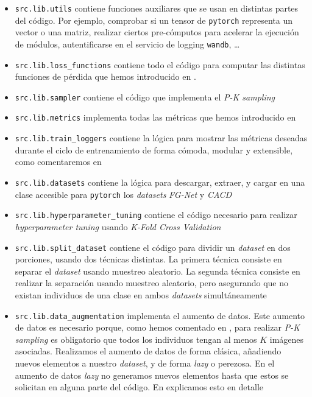 \begin{itemize}
    \item \lstinline{src.lib.utils} contiene funciones auxiliares que se usan en distintas partes del código. Por ejemplo, comprobar si un tensor de \lstinline{pytorch} representa un vector o una matriz, realizar ciertos pre-cómputos para acelerar la ejecución de módulos, autentificarse en el servicio de logging \lstinline{wandb}, \ldots
    \item \lstinline{src.lib.loss_functions} contiene todo el código para computar las distintas funciones de pérdida que hemos introducido en .
    \item \lstinline{src.lib.sampler} contiene el código que implementa el \textit{P-K sampling}
    \item \lstinline{src.lib.metrics} implementa todas las métricas que hemos introducido en 
    \item \lstinline{src.lib.train_loggers} contiene la lógica para mostrar las métricas deseadas durante el ciclo de entrenamiento de forma cómoda, modular y extensible, como comentaremos en 
    \item \lstinline{src.lib.datasets} contiene la lógica para descargar, extraer, y cargar en una clase accesible para \lstinline{pytorch} los \textit{datasets} \textit{FG-Net} y \textit{CACD}

    \item \lstinline{src.lib.hyperparameter_tuning} contiene el código necesario para realizar \textit{hyperparameter tuning} usando \textit{K-Fold Cross Validation}

    \item \lstinline{src.lib.split_dataset} contiene el código para dividir un \textit{dataset} en dos porciones, usando dos técnicas distintas. La primera técnica consiste en separar el \textit{dataset} usando muestreo aleatorio. La segunda técnica consiste en realizar la separación usando muestreo aleatorio, pero asegurando que no existan individuos de una clase en ambos \textit{datasets} simultáneamente
    \item \lstinline{src.lib.data_augmentation} implementa el aumento de datos. Este aumento de datos es necesario porque, como hemos comentado en , para realizar \textit{P-K sampling} es obligatorio que todos los individuos tengan al menos $K$ imágenes asociadas. Realizamos el aumento de datos de forma clásica, añadiendo nuevos elementos a nuestro \textit{dataset}, y de forma \textit{lazy} o perezosa. En el aumento de datos \textit{lazy} no generamos nuevos elementos hasta que estos se solicitan en alguna parte del código. En  explicamos esto en detalle
\end{itemize}

